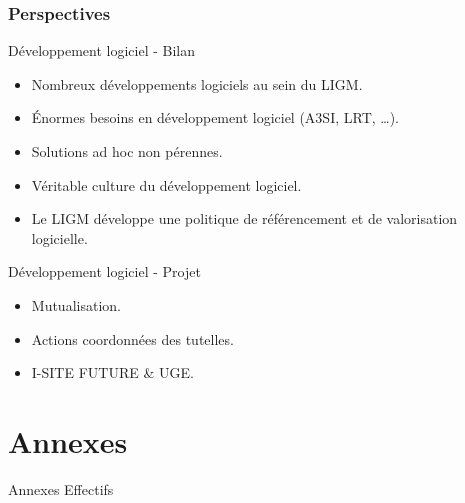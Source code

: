 \documentclass[]{beamer}
\begin{document}

\begin{frame}
  \frametitle{Perspectives}

  \begin{block}{Développement logiciel - Bilan}
    \begin{itemize}
      \item Nombreux développements logiciels au sein du LIGM.
      \item \'Enormes besoins en développement logiciel (A3SI, LRT, \dots).
      \item Solutions ad hoc non pérennes.
      \item Véritable culture du développement logiciel.
      \item Le LIGM développe une politique de référencement et de valorisation logicielle.
    \end{itemize}
  \end{block}

  \begin{block}{Développement logiciel - Projet}
    \begin{itemize}
      \item Mutualisation.
      \item Actions coordonnées des tutelles.
      \item I-SITE FUTURE \& UGE.
    \end{itemize}
  \end{block}

\end{frame}


\section*{Annexes}


\begin{frame}[label=conclusion, standout]{Annexes}
  Effectifs
\end{frame}

\end{document}
